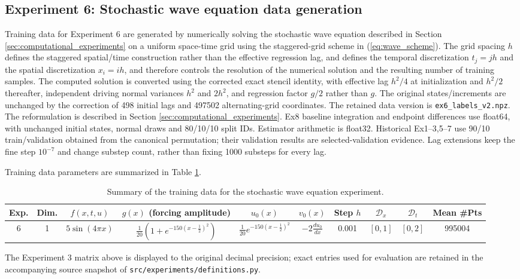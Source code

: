 \subsection{Experiment 6: Stochastic wave equation data generation}

Training data for Experiment 6 are generated by numerically solving the stochastic wave equation described in Section \ref{sec:computational_experiments} on a uniform space-time grid using the staggered-grid scheme in (\ref{eq:wave_scheme}). The grid spacing $h$ defines the staggered spatial/time construction rather than the effective regression lag, and defines the temporal discretization $t_j = jh$ and the spatial discretization $x_i = ih$, and therefore controls the resolution of the numerical solution and the resulting number of training samples. The computed solution is converted using the corrected exact stencil identity, with effective lag $h^2/4$ at initialization and $h^2/2$ thereafter, independent driving normal variances $h^2$ and $2h^2$, and regression factor $g/2$ rather than $g$. The original states/increments are unchanged by the correction of 498 initial lags and 497502 alternating-grid coordinates. The retained data version is \texttt{ex6\_labels\_v2.npz}. The reformulation is described in Section \ref{sec:computational_experiments}. Ex8 baseline integration and endpoint differences use float64, with unchanged initial states, normal draws and 80/10/10 split IDs. Estimator arithmetic is float32. Historical Ex1--3,5--7 use 90/10 train/validation obtained from the canonical permutation; their validation results are selected-validation evidence. Lag extensions keep the fine step $10^{-7}$ and change substep count, rather than fixing 1000 substeps for every lag.

Training data parameters are summarized in Table \ref{tab:SPDE_training_data}.

\begin{table}[H]
\centering
\small
\caption{Summary of the training data for the stochastic wave equation experiment.}
\label{tab:SPDE_training_data}
\begin{tabular}{@{}c c c c c c c c c c@{}}
\toprule
Exp. & Dim. & $f(x,t,u)$ & $g(x)$ (forcing amplitude) & $u_0(x)$ & $v_0(x)$ & Step $h$ & $\mathcal{D}_x$ & $\mathcal{D}_t$ & Mean \#Pts \\
\midrule
6 & 1 &
\footnotesize $5\sin(4\pi x)$ &
\footnotesize $\frac{1}{20}\left(1+e^{-150(x-\frac12)^2}\right)$ &
\footnotesize $\frac{1}{20} e^{-150(x-\frac12)^2}$ &
\footnotesize $-2 \frac{du_0}{dx}$ &
0.001 & $[0,1]$ & $[0,2]$ & 995004 \\
\bottomrule
\end{tabular}
\end{table}


The Experiment 3 matrix above is displayed to the original decimal precision; exact entries used for evaluation are retained in the accompanying source snapshot of \texttt{src/experiments/definitions.py}.
